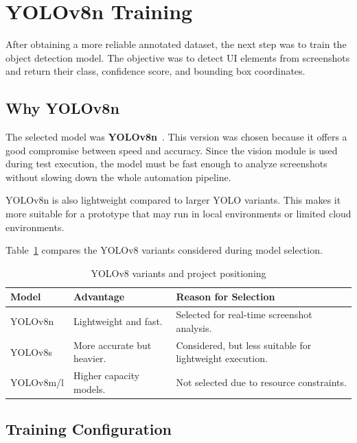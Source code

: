 \section{YOLOv8n Training}
\label{sec:yolov8_training}

After obtaining a more reliable annotated dataset, the next step was to train the object detection model. The objective was to detect UI elements from screenshots and return their class, confidence score, and bounding box coordinates.

\subsection{Why YOLOv8n}
\label{subsec:why_yolov8n}

The selected model was \textbf{YOLOv8n}~\cite{ultralytics_yolov8_docs,yolo_original}. This version was chosen because it offers a good compromise between speed and accuracy. Since the vision module is used during test execution, the model must be fast enough to analyze screenshots without slowing down the whole automation pipeline.

YOLOv8n is also lightweight compared to larger YOLO variants. This makes it more suitable for a prototype that may run in local environments or limited cloud environments.

Table~\ref{tab:yolo_variants} compares the YOLOv8 variants considered during model selection.

\begin{table}[H]
	\centering
	\caption{YOLOv8 variants and project positioning}
	\label{tab:yolo_variants}
	\renewcommand{\arraystretch}{1.35}
	\small
	\begin{tabularx}{\textwidth}{|l|X|X|}
		\hline
		\rowcolor{gray!20}
		\textbf{Model} & \textbf{Advantage} & \textbf{Reason for Selection} \\ \hline
		YOLOv8n & Lightweight and fast. & Selected for real-time screenshot analysis. \\ \hline
		YOLOv8s & More accurate but heavier. & Considered, but less suitable for lightweight execution. \\ \hline
		YOLOv8m/l & Higher capacity models. & Not selected due to resource constraints. \\ \hline
	\end{tabularx}
\end{table}

\subsection{Training Configuration}
\label{subsec:training_configuration}

